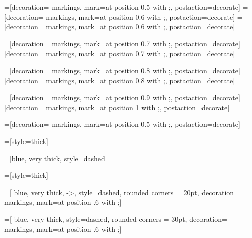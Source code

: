 =[decoration={ markings, mark=at position 0.5 with {\arrow[line width=\PathArrowLineWidth]{\PathArrowStyle};}}, postaction={decorate}]
=[decoration={ markings, mark=at position 0.6 with {\arrow[line width=\PathArrowLineWidth]{\PathArrowStyle};}}, postaction={decorate}]
=[decoration={ markings, mark=at position 0.6 with {\arrow[line width=0.7*\PathArrowLineWidth]{\PathArrowStyle};}}, postaction={decorate}]

=[decoration={ markings, mark=at position 0.7 with {\arrow[line width=\PathArrowLineWidth]{\PathArrowStyle};}}, postaction={decorate}]
=[decoration={ markings, mark=at position 0.7 with {\arrow[line width=0.7*\PathArrowLineWidth]{\PathArrowStyle};}}, postaction={decorate}]

=[decoration={ markings, mark=at position 0.8 with {\arrow[line width=\PathArrowLineWidth]{\PathArrowStyle};}}, postaction={decorate}]
=[decoration={ markings, mark=at position 0.8 with {\arrow[line width=0.7*\PathArrowLineWidth]{\PathArrowStyle};}}, postaction={decorate}]

=[decoration={ markings, mark=at position 0.9 with {\arrow[line width=\PathArrowLineWidth]{\PathArrowStyle};}}, postaction={decorate}]
=[decoration={ markings, mark=at position 1 with {\arrow[line width=\PathArrowLineWidth]{\PathArrowStyle};}}, postaction={decorate}]

=[decoration={ markings, mark=at position 0.5 with {;}}, postaction={decorate}]

=[style=thick]

=[blue, very thick, 
	style=dashed]

=[style=thick]

=[
	blue, very thick,%
	->, style=dashed, rounded corners = 20pt,
	decoration={ markings, mark=at position .6 with {;}}]
	 
=[
	blue, very thick, %
	style=dashed, rounded corners = 30pt,
	decoration={ markings, mark=at position .6 with {;}}]



